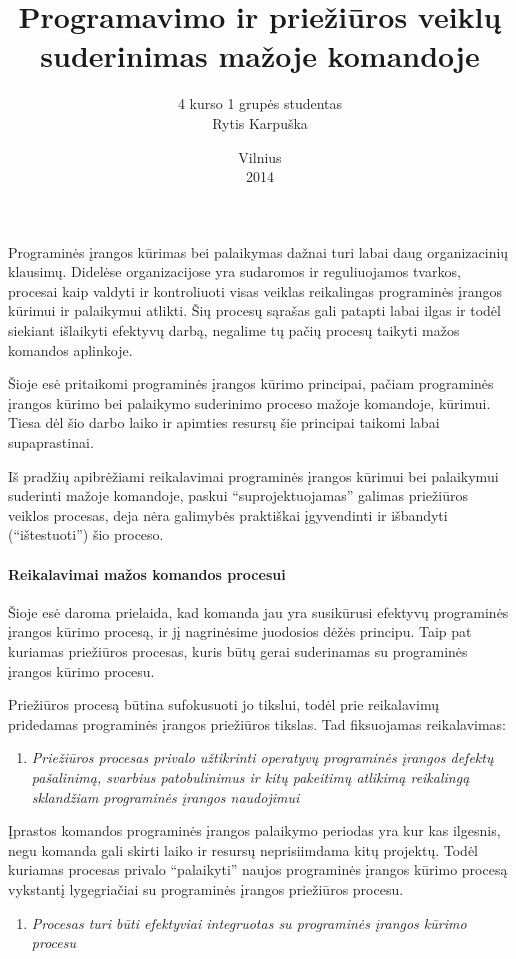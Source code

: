 \documentclass[12pt, a4paper, lithuanian, final]{article}
\title{Programavimo ir priežiūros veiklų suderinimas mažoje komandoje}
\author{
    4 kurso 1 grupės studentas \\
    Rytis Karpuška
}
\date{Vilnius \\
	2014}
\begin{document}
\maketitle


Programinės įrangos kūrimas bei palaikymas dažnai turi labai daug organizacinių klausimų.
Didelėse organizacijose yra sudaromos ir reguliuojamos tvarkos, procesai kaip valdyti ir kontroliuoti visas veiklas reikalingas programinės įrangos kūrimui ir palaikymui atlikti.
Šių procesų sąrašas gali patapti labai ilgas ir todėl siekiant išlaikyti efektyvų darbą, negalime tų pačių procesų taikyti mažos komandos aplinkoje.


Šioje esė pritaikomi programinės įrangos kūrimo principai, pačiam programinės įrangos kūrimo bei palaikymo suderinimo proceso mažoje komandoje, kūrimui.
Tiesa dėl šio darbo laiko ir apimties resursų šie principai taikomi labai supaprastinai.


Iš pradžių apibrėžiami reikalavimai programinės įrangos kūrimui bei palaikymui suderinti mažoje komandoje, paskui "`suprojektuojamas"' galimas priežiūros veiklos procesas, deja nėra galimybės praktiškai įgyvendinti ir išbandyti ("`ištestuoti"') šio proceso.


\paragraph{Reikalavimai mažos komandos procesui}


Šioje esė daroma prielaida, kad komanda jau yra susikūrusi efektyvų programinės įrangos kūrimo procesą, ir jį nagrinėsime juodosios dėžės principu.
Taip pat kuriamas priežiūros procesas, kuris būtų gerai suderinamas su programinės įrangos kūrimo procesu.


Priežiūros procesą būtina sufokusuoti jo tikslui, todėl prie reikalavimų pridedamas programinės įrangos priežiūros tikslas.
Tad fiksuojamas reikalavimas:
\begin{enumerate}
	\item \textit{Priežiūros procesas privalo užtikrinti operatyvų programinės įrangos defektų pašalinimą, svarbius patobulinimus ir kitų pakeitimų atlikimą reikalingą sklandžiam programinės įrangos naudojimui}
	\setcounter{reqList}{\theenumi}
\end{enumerate}


Įprastos komandos programinės įrangos palaikymo periodas yra kur kas ilgesnis, negu komanda gali skirti laiko ir resursų neprisiimdama kitų projektų.
Todėl kuriamas procesas privalo "`palaikyti"' naujos programinės įrangos kūrimo procesą vykstantį lygegriačiai su programinės įrangos priežiūros procesu.
\begin{enumerate}
	\setcounter{enumi}{\thereqList}
	\item \textit{Procesas turi būti efektyviai integruotas su programinės įrangos kūrimo procesu}
	\setcounter{reqList}{\theenumi}
\end{enumerate}
\end{document}
